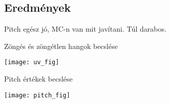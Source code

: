 \subsection{Eredmények}
Pitch egész jó, MC-n van mit javítani. Túl darabos.

Zöngés és zöngétlen hangok becslése

\texttt{[image: uv\_fig]}

Pitch értékek becslése

\texttt{[image: pitch\_fig]}